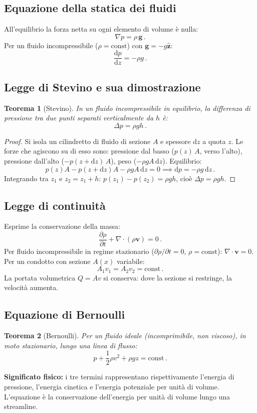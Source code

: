 \documentclass[11pt,a4paper]{article}
\renewcommand{\vec}[1]{\bm{#1}}
\theoremstyle{plain}
\newtheorem{teorema}{Teorema}[section]
\theoremstyle{definition}
\theoremstyle{remark}
\begin{document}
\subsection{Equazione della statica dei fluidi}

All'equilibrio la forza netta su ogni elemento di volume è nulla:
\[
  \nabla p=\rho\,\vec{g}\,.
\]
Per un fluido incompressibile ($\rho=\mathrm{const}$) con $\vec{g}=-g\hat{\bm{z}}$:
\[
  \frac{\mathrm{d}p}{\mathrm{d}z}=-\rho g\,.
\]

\subsection{Legge di Stevino e sua dimostrazione}

\begin{teorema}[Stevino]
In un fluido incompressibile in equilibrio, la differenza di pressione tra due
punti separati verticalmente da $h$ è:
\[
  \Delta p=\rho g h\,.
\]
\end{teorema}
\begin{proof}
Si isola un cilindretto di fluido di sezione $A$ e spessore $\mathrm{d}z$ a
quota $z$. Le forze che agiscono su di esso sono: pressione dal basso
($p(z)\,A$, verso l'alto), pressione dall'alto ($-p(z+\mathrm{d}z)\,A$),
peso ($-\rho g A\,\mathrm{d}z$). Equilibrio:
\[
  p(z)A-p(z+\mathrm{d}z)A-\rho g A\,\mathrm{d}z=0
  \implies \mathrm{d}p=-\rho g\,\mathrm{d}z\,.
\]
Integrando tra $z_1$ e $z_2=z_1+h$:
$p(z_1)-p(z_2)=\rho g h$, cioè $\Delta p=\rho g h$.
\end{proof}

\subsection{Legge di continuità}

Esprime la conservazione della massa:
\[
  \frac{\partial\rho}{\partial t}+\nabla\cdot(\rho\vec{v})=0\,.
\]
Per fluido incompressibile in regime stazionario ($\partial\rho/\partial t=0$,
$\rho=\mathrm{const}$): $\nabla\cdot\vec{v}=0$. Per un condotto con sezione
$A(x)$ variabile:
\[
  A_1 v_1=A_2 v_2=\mathrm{const}\,.
\]
La portata volumetrica $Q=Av$ si conserva: dove la sezione si restringe, la
velocità aumenta.

\subsection{Equazione di Bernoulli}

\begin{teorema}[Bernoulli]
Per un fluido ideale (incomprimibile, non viscoso), in moto stazionario, lungo
una linea di flusso:
\[
  p+\frac{1}{2}\rho v^2+\rho gz=\mathrm{const}\,.
\]
\end{teorema}
\textbf{Significato fisico:} i tre termini rappresentano rispettivamente
l'energia di pressione, l'energia cinetica e l'energia potenziale per unità
di volume. L'equazione è la conservazione dell'energia per unità di volume
lungo una streamline.
\end{document}
